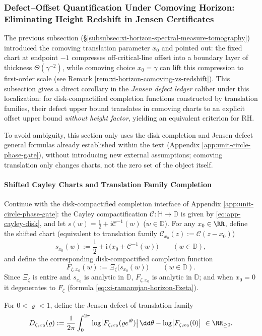 \subsubsection{Defect–Offset Quantification Under Comoving Horizon: Eliminating Height Redshift in Jensen Certificates}\label{subsubsec:xi-comoving-defect-delta-bound}
The previous subsection (\S\ref{subsubsec:xi-horizon-spectral-measure-tomography}) introduced the comoving translation parameter \(x_0\) and pointed out: the fixed chart at endpoint \(-1\) compresses off-critical-line offset into a boundary layer of thickness \(\Theta(\gamma^{-2})\), while comoving choice \(x_0=\gamma\) can lift this compression to first-order scale (see Remark \ref{rem:xi-horizon-comoving-vs-redshift}).
This subsection gives a direct corollary in the \emph{Jensen defect ledger} caliber under this localization: for disk-compactified completion functions constructed by translation families, their defect upper bound translates in comoving charts to an explicit offset upper bound \emph{without height factor}, yielding an equivalent criterion for RH.
\par
To avoid ambiguity, this section only uses the disk completion and Jensen defect general formulas already established within the text (Appendix \ref{app:unit-circle-phase-gate}), without introducing new external assumptions; comoving translation only changes charts, not the zero set of the object itself.

\paragraph{Shifted Cayley Charts and Translation Family Completion}
Continue with the disk-compactified completion interface of Appendix \ref{app:unit-circle-phase-gate}: the Cayley compactification \(\mathcal{C}:\mathbb{H}\to\mathbb{D}\) is given by \eqref{eq:app-cayley-disk}, and let \(s(w)=\tfrac12+\mathrm{i}\mathcal{C}^{-1}(w)\) (\(w\in\mathbb{D}\)).
For any \(x_0\in\RR\), define the shifted chart (equivalent to translation family \(\mathcal{C}_{x_0}(z):=\mathcal{C}(z-x_0)\))
\begin{equation}\label{eq:xi-comoving-shifted-s}
s_{x_0}(w):=\frac12+\mathrm{i}\,\bigl(x_0+\mathcal{C}^{-1}(w)\bigr)\qquad(w\in\mathbb{D}),
\end{equation}
and define the corresponding disk-compactified completion function
\begin{equation}\label{eq:xi-comoving-shifted-Fzeta}
F_{\zeta,x_0}(w):=\Xi_{\zeta}\!\bigl(s_{x_0}(w)\bigr)\qquad(w\in\mathbb{D}).
\end{equation}
Since \(\Xi_{\zeta}\) is entire and \(s_{x_0}\) is analytic in \(\mathbb{D}\), \(F_{\zeta,x_0}\) is analytic in \(\mathbb{D}\); and when \(x_0=0\) it degenerates to \(F_{\zeta}\) (formula \eqref{eq:xi-ramanujan-horizon-Fzeta}).
\par
For \(0<\varrho<1\), define the Jensen defect of translation family
\begin{equation}\label{eq:xi-comoving-shifted-jensen-defect}
D_{\zeta,x_0}(\varrho)
:=\frac{1}{2\pi}\int_{0}^{2\pi}\log\bigl|F_{\zeta,x_0}(\varrho e^{\mathrm{i}\theta})\bigr|\,\dd\theta-\log\bigl|F_{\zeta,x_0}(0)\bigr|\ \in\RR_{\ge 0}.
\end{equation}

